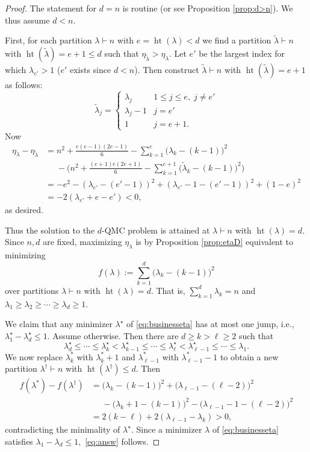 \documentclass[12pt,dvipsnames,accepted=2016-08-18,a4paper,onecolumn]{quantumarticle}
\def\la{\lambda}
\DeclareMathOperator{\het}{ht}
\def\la{\lambda}
\numberwithin{equation}{section}
\theoremstyle{definition}
\begin{document}
\begin{proof}
The statement for $d=n$ is routine (or see Proposition \ref{prop:d>n}). We thus assume $d<n$.

First, for each partition $\lambda\vdash n$ with
$e=\het(\lambda)<d$ we find a partition $\tilde\lambda\vdash n$ with 
$\het(\tilde\lambda)=e+1\leq d$ such that $\eta_{\tilde\lambda}>\eta_\lambda$. Let $e'$ be the largest index for which $\lambda_{e'}>1$ 
($e'$ exists since $d<n$). Then construct $\tilde\lambda\vdash n$ with $\het(\tilde\lambda)=e+1$ as follows:
\[
\tilde\lambda_j=
\begin{cases}
\lambda_j & 1\leq j\leq e, \; j\neq e'\\
\lambda_j-1 & j=e'\\
1 & j=e+1.
\end{cases}
\]
Now 
\[
\begin{split}
\eta_{\lambda}-\eta_{\tilde\lambda} & =
n^2 +\frac{e(e-1)(2e-1)}{6}
-\sum_{k=1}^e\big( \lambda_k - (k-1)\big)^2
 \\
 &\phantom{{}={}} -
\Big(
n^2 +\frac{(e+1)e(2e+1)}{6}
-\sum_{k=1}^{e+1}\big( \tilde\lambda_k - (k-1)\big)^2
\Big)
\\
&= 
-e^2 - (\la_{e'}-(e'-1))^2 + (\la_{e'}-1-(e'-1))^2 + (1-e)^2 
\\
&= 
-2(\la_{e'}+e-e')<0,
\end{split}
\]
as desired.

Thus the solution to the $d$-QMC problem is attained at $\lambda\vdash n$ with $\het(\lambda)=d$.
Since $n,d$ are fixed, maximizing $\eta_\lambda$ is by Proposition \ref{prop:etaD} equivalent to minimizing
\begin{equation}\label{eq:businesseta}
f(\lambda):=\sum_{k=1}^d\big( \lambda_k - (k-1)\big)^2
\end{equation}
over partitions $\lambda\vdash n$ with $\het(\lambda)=d$. That is,
$\sum_{k=1}^d \lambda_k=n$ and 
$\lambda_1\geq\lambda_2\geq\cdots\geq\lambda_d\geq1$.

We claim that any minimizer $\lambda^\star$ of \eqref{eq:businesseta} has at most one jump, i.e., $\lambda^\star_1-\lambda^\star_d\leq1.$ Assume otherwise. Then there are $d\geq k > \ell \geq2$ such that
\[
\lambda^\star_d \leq \cdots \leq \lambda^\star_k < \lambda^\star_{k-1} \leq\cdots\leq\lambda^\star_\ell<\lambda^\star_{\ell-1}\leq\cdots \leq \lambda_1.
\]
We now replace $\lambda^*_k$ with $\lambda^*_k+1$ 
and $\lambda^*_{\ell-1}$ with $\lambda^*_{\ell-1}-1$ to obtain a new partition $\lambda^\dagger\vdash n$ with $\het(\lambda^\dagger)\leq d$. Then
\[
\begin{split}
f(\lambda^*)-f(\lambda^\dagger)
 & = 
\big( \lambda_k - (k-1)\big)^2 + 
\big( \lambda_{\ell-1} - (\ell-2)\big)^2  \\
&\phantom{{}={}}
-
\big( \lambda_k+1 - (k-1)\big)^2 
-
\big( \lambda_{\ell-1}-1 - (\ell-2)\big)^2 
\\
&=
2 (k-\ell) + 2 (\lambda_{\ell-1}-\lambda_k) >0,
 \end{split}
\]
contradicting the minimality of $\lambda^\star$. 
Since a minimizer $\lambda$ of \eqref{eq:businesseta} satisfies $\lambda_1-\lambda_d\leq1,$
\eqref{eq:answ} follows.


\end{proof}
\end{document}
